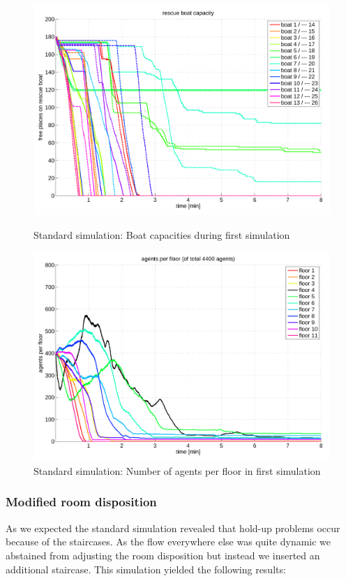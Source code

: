 \documentclass[11pt]{article}
\begin{document}
\begin{figure}[H]
\centering
{\begin{minipage}[t]{7.4cm}
\includegraphics[width=\textwidth]{pics/standard_cap1.pdf}
\caption{Standard simulation: Boat capacities during first simulation}
\end{minipage}}
{\begin{minipage}[t]{7.4cm}
\includegraphics[width=\textwidth]{pics/standard_agents1.pdf}
\caption{Standard simulation: Number of agents per floor in first simulation}
\end{minipage}}
\end{figure}

\subsubsection{Modified room disposition}
As we expected the standard simulation revealed that hold-up problems occur because of the staircases. As the flow everywhere else was quite dynamic we abstained from adjusting the room disposition but instead we inserted an additional staircase. This simulation yielded the following results:
\end{document}
